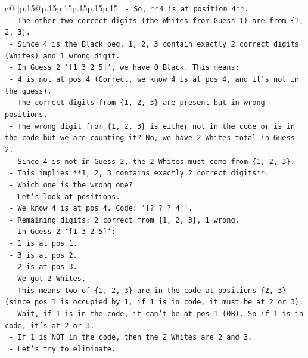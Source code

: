 \documentclass{article}
\begin{document}
{\begin{supertabular}{c@{$\;$}|p{.15\linewidth}@{}p{.15\linewidth}p{.15\linewidth}p{.15\linewidth}p{.15\linewidth}p{.15\linewidth}}
{{{\texttt{    {-} So, **4 is at position 4**.} \\
\texttt{    {-} The other two correct digits (the Whites from Guess 1) are from \{1, 2, 3\}.} \\
\texttt{    {-} Since 4 is the Black peg, 1, 2, 3 contain exactly 2 correct digits (Whites) and 1 wrong digit.} \\
\texttt{    {-} In Guess 2 `{[}1 3 2 5{]}`, we have 0 Black. This means:} \\
\texttt{      {-} 4 is not at pos 4 (Correct, we know 4 is at pos 4, and it's not in the guess).} \\
\texttt{      {-} The correct digits from \{1, 2, 3\} are present but in wrong positions.} \\
\texttt{      {-} The wrong digit from \{1, 2, 3\} is either not in the code or is in the code but we are counting it? No, we have 2 Whites total in Guess 2.} \\
\texttt{      {-} Since 4 is not in Guess 2, the 2 Whites must come from \{1, 2, 3\}.} \\
\texttt{      {-} This implies **1, 2, 3 contains exactly 2 correct digits**.} \\
\texttt{      {-} Which one is the wrong one?} \\
\texttt{      {-} Let's look at positions.} \\
\texttt{      {-} We know 4 is at pos 4. Code: `{[}? ? ? 4{]}`.} \\
\texttt{      {-} Remaining digits: 2 correct from \{1, 2, 3\}, 1 wrong.} \\
\texttt{      {-} In Guess 2 `{[}1 3 2 5{]}`:} \\
\texttt{        {-} 1 is at pos 1.} \\
\texttt{        {-} 3 is at pos 2.} \\
\texttt{        {-} 2 is at pos 3.} \\
\texttt{        {-} We got 2 Whites.} \\
\texttt{        {-} This means two of \{1, 2, 3\} are in the code at positions \{2, 3\} (since pos 1 is occupied by 1, if 1 is in code, it must be at 2 or 3).} \\
\texttt{        {-} Wait, if 1 is in the code, it can't be at pos 1 (0B). So if 1 is in code, it's at 2 or 3.} \\
\texttt{        {-} If 1 is NOT in the code, then the 2 Whites are 2 and 3.} \\
\texttt{        {-} Let's try to eliminate.} \\
}}}
\end{supertabular}}
\end{document}

